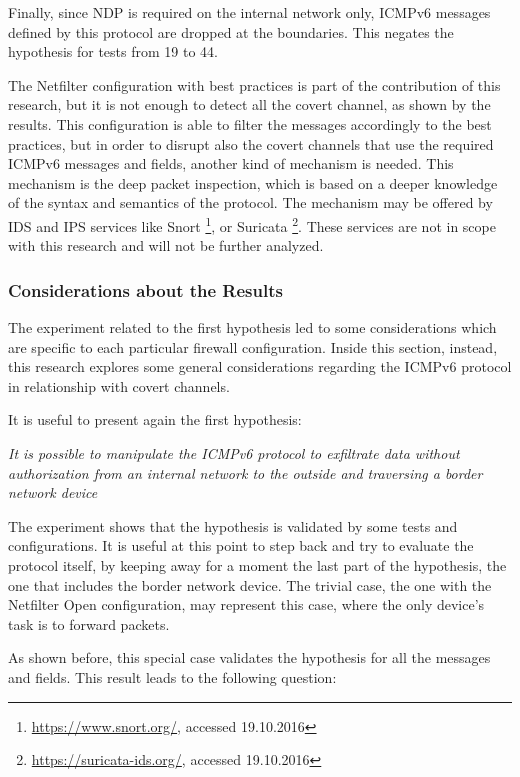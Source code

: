 \documentclass[12pt]{article}
\begin{document}
Finally, since NDP is required on the internal network only, ICMPv6 messages defined by this protocol are dropped at the boundaries. This negates the hypothesis for tests from 19 to 44.

The Netfilter configuration with best practices is part of the contribution of this research, but it is not enough to detect all the covert channel, as shown by the results. This configuration is able to filter the messages accordingly to the best practices, but in order to disrupt also the covert channels that use the required ICMPv6 messages and fields, another kind of mechanism is needed. This mechanism is the deep packet inspection, which is based on a deeper knowledge of the syntax and semantics of the protocol. The mechanism may be offered by IDS and IPS services like Snort \footnote{\url{https://www.snort.org/}, accessed 19.10.2016}, or Suricata \footnote{\url{https://suricata-ids.org/}, accessed 19.10.2016}. These services are not in scope with this research and will not be further analyzed.


\subsubsection{Considerations about the Results}
\label{resultsFirstComparison}

The experiment related to the first hypothesis led to some considerations which are specific to each particular firewall configuration. Inside this section, instead, this research explores some general considerations regarding the ICMPv6 protocol in relationship with covert channels.

It is useful to present again the first hypothesis:

\textit{It is possible to manipulate the ICMPv6 protocol to exfiltrate data without authorization from an internal network to the outside and traversing a border network device}

The experiment shows that the hypothesis is validated by some tests and configurations. It is useful at this point to step back and try to evaluate the protocol itself, by keeping away for a moment the last part of the hypothesis, the one that includes the border network device. The trivial case, the one with the Netfilter Open configuration, may represent this case, where the only device's task is to forward packets.

As shown before, this special case validates the hypothesis for all the messages and fields. This result leads to the following question:
\end{document}
